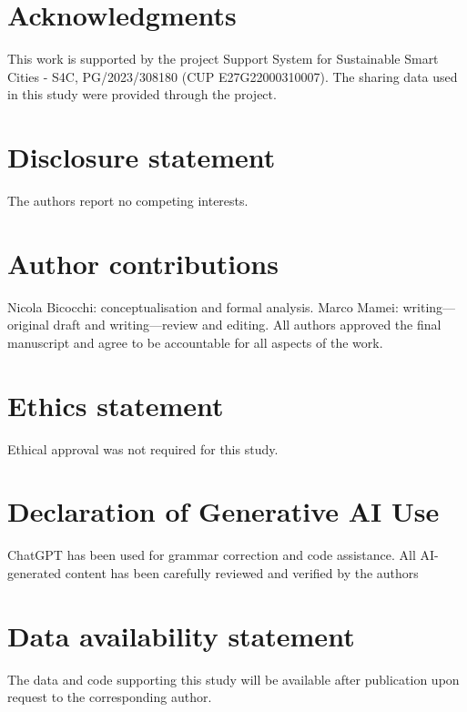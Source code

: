 \documentclass{interact}
\begin{document}
\section*{Acknowledgments}
This work is supported by the project Support System for Sustainable Smart Cities - S4C, PG/2023/308180 (CUP E27G22000310007). The sharing data used in this study were provided through the project.

\section*{Disclosure statement}
The authors report no competing interests.

\section*{Author contributions}
Nicola Bicocchi: conceptualisation and formal analysis. Marco Mamei: writing---original draft and writing---review and editing. All authors approved the final manuscript and agree to be accountable for all aspects of the work.

\section*{Ethics statement}
Ethical approval was not required for this study.

\section*{Declaration of Generative AI Use}
ChatGPT has been used for grammar correction and code assistance.
All AI-generated content has been carefully reviewed and verified by the authors

\section*{Data availability statement}
The data and code supporting this study will be available after publication upon request to the corresponding author.



\end{document}
